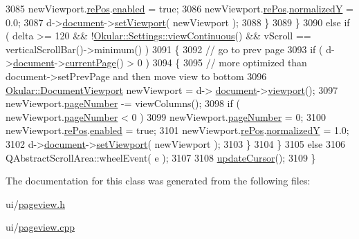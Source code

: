 \begin{DoxyCode}
3085             newViewport.\hyperlink{classOkular_1_1DocumentViewport_a054f24bcba44b795a3671ac53693ff45}{rePos}.\hyperlink{classOkular_1_1DocumentViewport_a6dddb31dbc72d7fb3efe094d840d8692}{enabled} = \textcolor{keyword}{true};
3086             newViewport.\hyperlink{classOkular_1_1DocumentViewport_a054f24bcba44b795a3671ac53693ff45}{rePos}.\hyperlink{classOkular_1_1DocumentViewport_aa86271c42d62ef102c6ba570bf40e770}{normalizedY} = 0.0;
3087             d->\hyperlink{classPageViewPrivate_a50645b9853306cffd74e51efb677e5b4}{document}->\hyperlink{classOkular_1_1Document_a1afaf8b8b5cb1e715949024fb75bb767}{setViewport}( newViewport );
3088         \}
3089     \}
3090     \textcolor{keywordflow}{else} \textcolor{keywordflow}{if} ( delta >= 120 && !\hyperlink{classOkular_1_1Settings_a6f16a784dc815b9192ce24d054e3f82b}{Okular::Settings::viewContinuous}() && 
      vScroll == verticalScrollBar()->minimum() )
3091     \{
3092         \textcolor{comment}{// go to prev page}
3093         \textcolor{keywordflow}{if} ( d->\hyperlink{classPageViewPrivate_a50645b9853306cffd74e51efb677e5b4}{document}->\hyperlink{classOkular_1_1Document_a42ec374d73794bf56d7e7b11f1f56319}{currentPage}() > 0 )
3094         \{
3095             \textcolor{comment}{// more optimized than document->setPrevPage and then move view to bottom}
3096             \hyperlink{classOkular_1_1DocumentViewport}{Okular::DocumentViewport} newViewport = d->
      \hyperlink{classPageViewPrivate_a50645b9853306cffd74e51efb677e5b4}{document}->\hyperlink{classOkular_1_1Document_abb8738de0a53aa4a9f552de0e1e749f8}{viewport}();
3097             newViewport.\hyperlink{classOkular_1_1DocumentViewport_a122674d4a493e79b1aa5fd5c00e81c93}{pageNumber} -= viewColumns();
3098             \textcolor{keywordflow}{if} ( newViewport.\hyperlink{classOkular_1_1DocumentViewport_a122674d4a493e79b1aa5fd5c00e81c93}{pageNumber} < 0 )
3099                 newViewport.\hyperlink{classOkular_1_1DocumentViewport_a122674d4a493e79b1aa5fd5c00e81c93}{pageNumber} = 0;
3100             newViewport.\hyperlink{classOkular_1_1DocumentViewport_a054f24bcba44b795a3671ac53693ff45}{rePos}.\hyperlink{classOkular_1_1DocumentViewport_a6dddb31dbc72d7fb3efe094d840d8692}{enabled} = \textcolor{keyword}{true};
3101             newViewport.\hyperlink{classOkular_1_1DocumentViewport_a054f24bcba44b795a3671ac53693ff45}{rePos}.\hyperlink{classOkular_1_1DocumentViewport_aa86271c42d62ef102c6ba570bf40e770}{normalizedY} = 1.0;
3102             d->\hyperlink{classPageViewPrivate_a50645b9853306cffd74e51efb677e5b4}{document}->\hyperlink{classOkular_1_1Document_a1afaf8b8b5cb1e715949024fb75bb767}{setViewport}( newViewport );
3103         \}
3104     \}
3105     \textcolor{keywordflow}{else}
3106         QAbstractScrollArea::wheelEvent( e );
3107 
3108     \hyperlink{classPageView_a0054ba6d2967fa31dea42dcc9d9020b6}{updateCursor}();
3109 \}
\end{DoxyCode}


The documentation for this class was generated from the following files\+:\begin{DoxyCompactItemize}
\item 
ui/\hyperlink{pageview_8h}{pageview.\+h}\item 
ui/\hyperlink{pageview_8cpp}{pageview.\+cpp}\end{DoxyCompactItemize}
